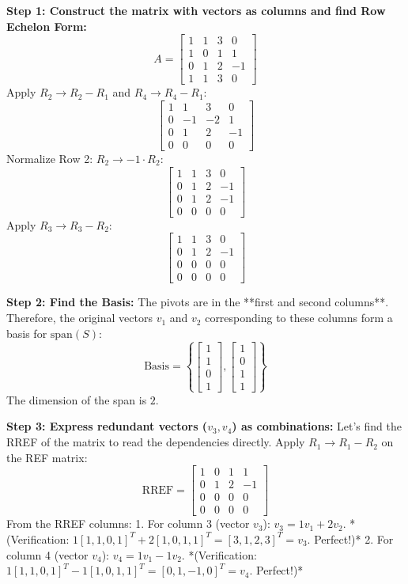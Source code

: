 \documentclass[11pt,a4paper]{article}
\begin{document}
\begin{solutionbox}
\textbf{Step 1: Construct the matrix with vectors as columns and find Row Echelon Form:}
\[ A = \begin{bmatrix} 1 & 1 & 3 & 0 \\ 1 & 0 & 1 & 1 \\ 0 & 1 & 2 & -1 \\ 1 & 1 & 3 & 0 \end{bmatrix} \]
Apply $R_2 \to R_2 - R_1$ and $R_4 \to R_4 - R_1$:
\[ \begin{bmatrix} 1 & 1 & 3 & 0 \\ 0 & -1 & -2 & 1 \\ 0 & 1 & 2 & -1 \\ 0 & 0 & 0 & 0 \end{bmatrix} \]
Normalize Row 2: $R_2 \to -1 \cdot R_2$:
\[ \begin{bmatrix} 1 & 1 & 3 & 0 \\ 0 & 1 & 2 & -1 \\ 0 & 1 & 2 & -1 \\ 0 & 0 & 0 & 0 \end{bmatrix} \]
Apply $R_3 \to R_3 - R_2$:
\[ \begin{bmatrix} 1 & 1 & 3 & 0 \\ 0 & 1 & 2 & -1 \\ 0 & 0 & 0 & 0 \\ 0 & 0 & 0 & 0 \end{bmatrix} \]

\textbf{Step 2: Find the Basis:}
The pivots are in the **first and second columns**. 
Therefore, the original vectors $v_1$ and $v_2$ corresponding to these columns form a basis for $\text{span}(S)$:
\[ \text{Basis} = \left\{ \begin{bmatrix} 1 \\ 1 \\ 0 \\ 1 \end{bmatrix}, \begin{bmatrix} 1 \\ 0 \\ 1 \\ 1 \end{bmatrix} \right\} \]
The dimension of the span is $2$.

\textbf{Step 3: Express redundant vectors ($v_3, v_4$) as combinations:}
Let's find the RREF of the matrix to read the dependencies directly.
Apply $R_1 \to R_1 - R_2$ on the REF matrix:
\[ \text{RREF} = \begin{bmatrix} 1 & 0 & 1 & 1 \\ 0 & 1 & 2 & -1 \\ 0 & 0 & 0 & 0 \\ 0 & 0 & 0 & 0 \end{bmatrix} \]
From the RREF columns:
1. For column 3 (vector $v_3$): $v_3 = 1 v_1 + 2 v_2$.
   *(Verification: $1[1, 1, 0, 1]^T + 2[1, 0, 1, 1]^T = [3, 1, 2, 3]^T = v_3$. Perfect!)*
2. For column 4 (vector $v_4$): $v_4 = 1 v_1 - 1 v_2$.
   *(Verification: $1[1, 1, 0, 1]^T - 1[1, 0, 1, 1]^T = [0, 1, -1, 0]^T = v_4$. Perfect!)*
\end{solutionbox}
\end{document}
